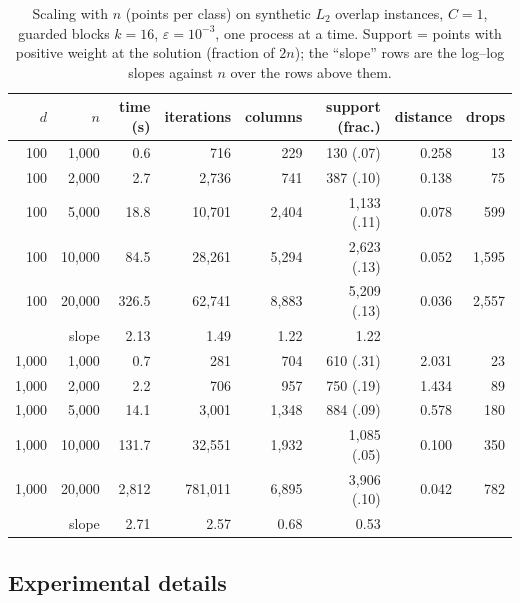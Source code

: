 \documentclass[pdflatex,sn-apa]{sn-jnl}%
\theoremstyle{thmstyleone}
\theoremstyle{thmstyletwo}
\begin{document}
\begin{table}[htbp]\centering\scriptsize
\caption{Scaling with $n$ (points per class) on synthetic $L_2$
overlap instances, $C{=}1$, guarded blocks $k{=}16$,
$\varepsilon=10^{-3}$, one process at a time. Support = points with
positive weight at the solution (fraction of $2n$); the ``slope'' rows
are the log--log slopes against $n$ over the rows above them.}\label{tab:nscale}
\begin{tabular}{rrrrrrrr}\toprule
$d$ & $n$ & time (s) & iterations & columns & support (frac.) & distance & drops \\\midrule
100 & 1,000 & 0.6 & 716 & 229 & 130 (.07) & 0.258 & 13 \\
100 & 2,000 & 2.7 & 2,736 & 741 & 387 (.10) & 0.138 & 75 \\
100 & 5,000 & 18.8 & 10,701 & 2,404 & 1,133 (.11) & 0.078 & 599 \\
100 & 10,000 & 84.5 & 28,261 & 5,294 & 2,623 (.13) & 0.052 & 1,595 \\
100 & 20,000 & 326.5 & 62,741 & 8,883 & 5,209 (.13) & 0.036 & 2,557 \\
\multicolumn{2}{r}{slope} & 2.13 & 1.49 & 1.22 & 1.22 & & \\
\midrule
1,000 & 1,000 & 0.7 & 281 & 704 & 610 (.31) & 2.031 & 23 \\
1,000 & 2,000 & 2.2 & 706 & 957 & 750 (.19) & 1.434 & 89 \\
1,000 & 5,000 & 14.1 & 3,001 & 1,348 & 884 (.09) & 0.578 & 180 \\
1,000 & 10,000 & 131.7 & 32,551 & 1,932 & 1,085 (.05) & 0.100 & 350 \\
1,000 & 20,000 & 2,812 & 781,011 & 6,895 & 3,906 (.10) & 0.042 & 782 \\
\multicolumn{2}{r}{slope} & 2.71 & 2.57 & 0.68 & 0.53 & & \\
\bottomrule
\end{tabular}\end{table}

\subsection{Experimental details}\label{app:details}
\end{document}

